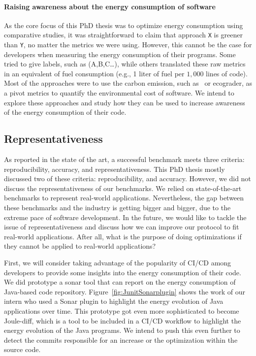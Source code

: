 \paragraph{Raising awareness about the energy consumption of software}
As the core focus of this PhD thesis was to optimize energy consumption using comparative studies, it was straightforward to claim that approach \texttt{X} is greener than \texttt{Y}, no matter the metrics we were using.
However, this cannot be the case for developers when measuring the energy consumption of their programs.
Some tried to give labels, such as (A,B,C\dots), while others translated these raw metrics in an equivalent of fuel consumption (e.g., 1 liter of fuel per $1,000$ lines of code).
Most of the approaches were to use the carbon emission, such as~\cite{patterson2021carbon} or ecograder, as a pivot metrics to quantify the environmental cost of software.
We intend to explore these approaches and study how they can be used to increase awareness of the energy consumption of their code.

\subsection*{Representativeness}
As reported in the state of the art, a successful benchmark meets three criteria: reproducibility, accuracy, and representativeness.
This PhD thesis mostly discussed two of these criteria: reproducibility, and accuracy.
However, we did not discuss the representativeness of our benchmarks.
We relied on state-of-the-art benchmarks to represent real-world applications.
Nevertheless, the gap between these benchmarks and the industry is getting bigger and bigger, due to the extreme pace of software development.
In the future, we would like to tackle the issue of representativeness and discuss how we can improve our protocol to fit real-world applications.
After all, what is the purpose of doing optimizations if they cannot be applied to real-world applications?

First, we will consider taking advantage of the popularity of CI/CD among developers to provide some insights into the energy consumption of their code.
We did prototype a sonar tool that can report on the energy consumption of Java-based code repository.
Figure~\ref{fig:JunitSonarplugin} shows the work of our intern who used a Sonar plugin to highlight the energy evolution of Java applications over time.
This prototype got even more sophisticated to become Joule-diff, which is a tool to be included in a CI/CD workflow to highlight the energy evolution of the Java programs.
We intend to push this even further to detect the commits responsible for an increase or the optimization within the source code.


